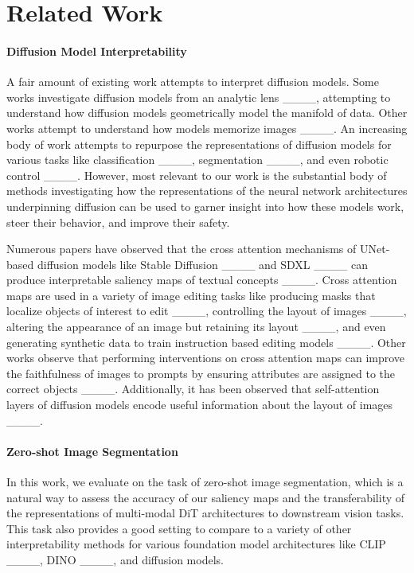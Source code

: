 \section{Related Work}
\paragraph{Diffusion Model Interpretability}

A fair amount of existing work attempts to interpret diffusion models. Some works investigate diffusion models from an analytic lens ____, attempting to understand how diffusion models geometrically model the manifold of data. Other works attempt to understand how models memorize images ____. An increasing body of work attempts to repurpose the representations of diffusion models for various tasks like classification ____, segmentation ____, and even robotic control ____. However, most relevant to our work is the substantial body of methods investigating how the representations of the neural network architectures underpinning diffusion can be used to garner insight into how these models work, steer their behavior, and improve their safety. 

Numerous papers have observed that the cross attention mechanisms of UNet-based diffusion models like Stable Diffusion ____ and SDXL ____ can produce interpretable saliency maps of textual concepts ____. Cross attention maps are used in a variety of image editing tasks like producing masks that localize objects of interest to edit ____, controlling the layout of images ____, altering the appearance of an image but retaining its layout ____, and even generating synthetic data to train instruction based editing models ____. Other works observe that performing interventions on cross attention maps can improve the faithfulness of images to prompts by ensuring attributes are assigned to the correct objects ____.  Additionally, it has been observed that self-attention layers of diffusion models encode useful information about the layout of images ____. 

%


\paragraph{Zero-shot Image Segmentation}
In this work, we evaluate \tool{} on the task of zero-shot image segmentation, which is a natural way to assess the accuracy of our saliency maps and the transferability of the representations of multi-modal DiT architectures to downstream vision tasks. This task also provides a good setting to compare to a variety of other interpretability methods for various foundation model architectures like CLIP ____, DINO ____, and diffusion models.  

